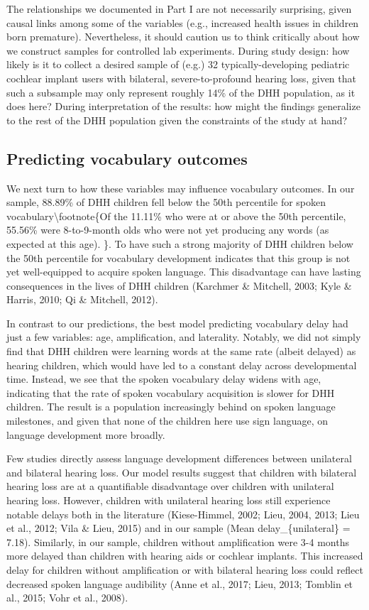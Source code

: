 \documentclass[english,man]{apa6}
\begin{document}
The relationships we documented in Part I are not necessarily surprising, given causal links among some of the variables (e.g., increased health issues in children born premature). Nevertheless, it should caution us to think critically about how we construct samples for controlled lab experiments. During study design: how likely is it to collect a desired sample of (e.g.) 32 typically-developing pediatric cochlear implant users with bilateral, severe-to-profound hearing loss, given that such a subsample may only represent roughly 14\% of the DHH population, as it does here? During interpretation of the results: how might the findings generalize to the rest of the DHH population given the constraints of the study at hand?

\hypertarget{predicting-vocabulary-outcomes}{%
\subsection{Predicting vocabulary outcomes}\label{predicting-vocabulary-outcomes}}

We next turn to how these variables may influence vocabulary outcomes. In our sample, 88.89\% of DHH children fell below the 50th percentile for spoken vocabulary\textbackslash{}footnote\{Of the 11.11\% who were at or above the 50th percentile, 55.56\% were 8-to-9-month olds who were not yet producing any words (as expected at this age). \}. To have such a strong majority of DHH children below the 50th percentile for vocabulary development indicates that this group is not yet well-equipped to acquire spoken language. This disadvantage can have lasting consequences in the lives of DHH children (Karchmer \& Mitchell, 2003; Kyle \& Harris, 2010; Qi \& Mitchell, 2012).

In contrast to our predictions, the best model predicting vocabulary delay had just a few variables: age, amplification, and laterality. Notably, we did not simply find that DHH children were learning words at the same rate (albeit delayed) as hearing children, which would have led to a constant delay across developmental time. Instead, we see that the spoken vocabulary delay widens with age, indicating that the rate of spoken vocabulary acquisition is slower for DHH children. The result is a population increasingly behind on spoken language milestones, and given that none of the children here use sign language, on language development more broadly.

Few studies directly assess language development differences between unilateral and bilateral hearing loss. Our model results suggest that children with bilateral hearing loss are at a quantifiable disadvantage over children with unilateral hearing loss. However, children with unilateral hearing loss still experience notable delays both in the literature (Kiese-Himmel, 2002; Lieu, 2004, 2013; Lieu et al., 2012; Vila \& Lieu, 2015) and in our sample (Mean delay\_\{unilateral\} = 7.18). Similarly, in our sample, children without amplification were 3-4 months more delayed than children with hearing aids or cochlear implants. This increased delay for children without amplification or with bilateral hearing loss could reflect decreased spoken language audibility (Anne et al., 2017; Lieu, 2013; Tomblin et al., 2015; Vohr et al., 2008).
\end{document}

